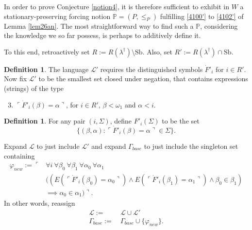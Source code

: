\documentclass[12pt, twoside]{memoir}
\numberwithin{equation}{section}
\theoremstyle{definition}
\newtheorem{defi}[thm]{Definition}
\theoremstyle{remark}
\theoremstyle{definition}
\theoremstyle{definition}
\theoremstyle{definition}
\theoremstyle{remark}
\begin{document}
In order to prove Conjecture \ref{notion4}, it is therefore sufficient to exhibit in $W$ a stationary-preserving forcing notion $\mathbb{P} = (P, \leq_P)$ fulfilling \ref{4100'} to \ref{4102'} of Lemma \ref{lem26an}. The most straightforward way to find such a $\mathbb{P}$, considering the knowledge we so far possess, is perhaps to additively define it.

To this end, retroactively set $R := R(\lambda^{\dagger}) \setminus \mathrm{Sb}$. Also, set $R' := R(\lambda^{\dagger}) \cap \mathrm{Sb}$.

\begin{defi}\label{defl'}
The language $\mathcal{L}'$ requires the distinguished symbols $\dot{F}'_i$ for $i \in R'$. Now fix $\mathcal{L}'$ to be the smallest set closed under negation, that contains expressions (strings) of the type
\begin{enumerate}[label=(L\arabic*), leftmargin=40pt]
    \setcounter{enumi}{2}
    \item $\ulcorner \dot{F}'_i (\beta) = \alpha \urcorner$, for $i \in R'$, $\beta < \omega_1$ and $\alpha < i$.
\end{enumerate}
\end{defi}

\begin{defi}
For any pair $(i, \Sigma)$, define $F'_i(\Sigma)$ to be the set 
\begin{equation*}
    \{(\beta, \alpha) : \ulcorner \dot{F}'_i(\beta) = \alpha \urcorner \in \Sigma\} \text{.}
\end{equation*}
\end{defi}

Expand $\mathcal{L}$ to just include $\mathcal{L}'$ and expand $\Gamma_{base}$ to just include the singleton set containing
\begin{align*}
    \varphi_{new} := \ulcorner & \forall i \ \forall \beta_0 \ \forall \beta_1 \ \forall \alpha_0 \ \forall \alpha_1 \\
    & ((E(\ulcorner \dot{F}'_i (\beta_0) = \alpha_0 \urcorner) \wedge E(\ulcorner \dot{F}'_i (\beta_1) = \alpha_1 \urcorner) \wedge \beta_0 \in \beta_1) \\
    & \implies \alpha_0 \in \alpha_1) \urcorner \text{.}
\end{align*}
In other words, reassign
\begin{align*}
    \mathcal{L} := \ & \mathcal{L} \cup \mathcal{L}' \\
    \Gamma_{base} := \ & \Gamma_{base} \cup \{\varphi_{new}\} \text{.}
\end{align*}
\end{document}
